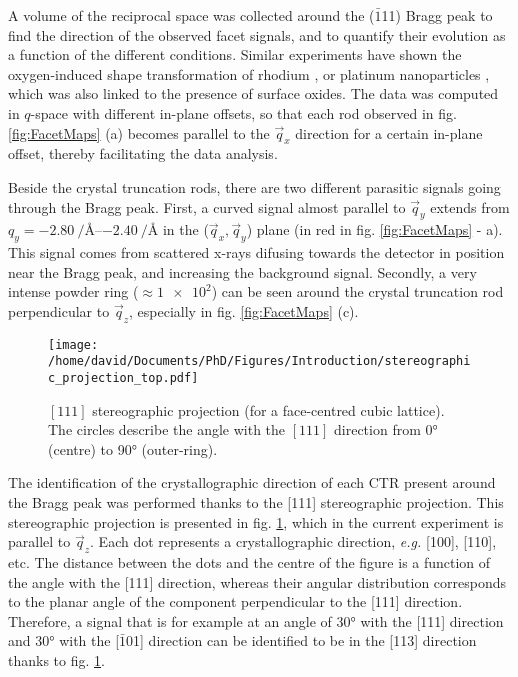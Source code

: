 A volume of the reciprocal space was collected around the ($\bar{1}$11) Bragg peak to find the direction of the observed facet signals, and to quantify their evolution as a function of the different conditions.
Similar experiments have shown the oxygen-induced shape transformation of rhodium \parencite{Nolte2008}, or platinum nanoparticles \parencite{Hejral2013}, which was also linked to the presence of surface oxides.
The data was computed in $q$-space with different in-plane offsets, so that each rod observed in fig. \ref{fig:FacetMaps} (a) becomes parallel to the $\vec{q}_x$ direction for a certain in-plane offset, thereby facilitating the data analysis.

Beside the crystal truncation rods, there are two different parasitic signals going through the Bragg peak.
First, a curved signal almost parallel to $\vec{q}_y$ extends from $q_y = \qtyrange{-2.80}{-2.40}{\per\angstrom}$ in the ($\vec{q}_x, \vec{q}_y$) plane (in red in fig. \ref{fig:FacetMaps} - a).
This signal comes from scattered x-rays difusing towards the detector in position near the Bragg peak, and increasing the background signal.
Secondly, a very intense powder ring ($\approx \num{1e2}$) can be seen around the crystal truncation rod perpendicular to $\vec{q}_z$, especially in fig. \ref{fig:FacetMaps} (c).

\begin{figure}[!htb]
    \centering
    \texttt{[image: /home/david/Documents/PhD/Figures/Introduction/stereographic\_projection\_top.pdf]}
    \caption{
        $[111]$ stereographic projection (for a face-centred cubic lattice).
        The circles describe the angle with the $[111]$ direction from \ang{0} (centre) to \ang{90} (outer-ring).
    }
    \label{fig:StereoTop}
\end{figure}

The identification of the crystallographic direction of each CTR present around the Bragg peak was performed thanks to the [111] stereographic projection.
This stereographic projection is presented in fig. \ref{fig:StereoTop}, which in the current experiment is parallel to $\vec{q}_z$.
Each dot represents a crystallographic direction, \textit{e.g.} [100], [110], etc.
The distance between the dots and the centre of the figure is a function of the angle with the [111] direction, whereas their angular distribution corresponds to the planar angle of the component perpendicular to the [111] direction.
Therefore, a signal that is for example at an angle of \ang{30} with the [111] direction and \ang{30} with the [$\bar{1}$01] direction can be identified to be in the [113] direction thanks to fig. \ref{fig:StereoTop}.

